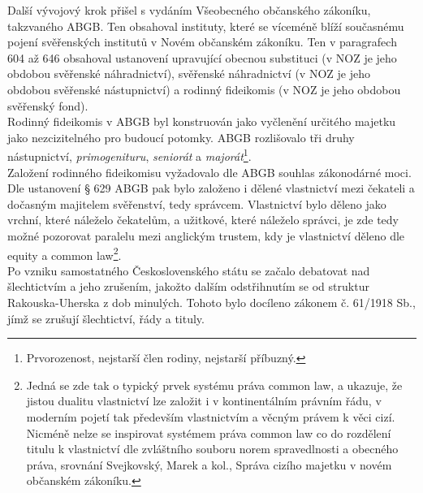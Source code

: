 \documentclass{article}
\begin{document}

Další vývojový krok přišel s vydáním Všeobecného občanského zákoníku, takzvaného ABGB. Ten obsahoval instituty, které se víceméně blíží současnému pojení svěřenských institutů v Novém občanském zákoníku. Ten v paragrafech 604 až 646 obsahoval ustanovení upravující obecnou substituci (v NOZ je jeho obdobou svěřenské náhradnictví), svěřenské náhradnictví (v NOZ je jeho obdobou svěřenské nástupnictví) a rodinný fideikomis (v NOZ je jeho obdobou svěřenský fond).\\

Rodinný fideikomis v ABGB byl konstruován jako vyčlenění určitého majetku jako nezcizitelného pro budoucí potomky. ABGB rozlišovalo tři druhy nástupnictví, \textit{primogenituru}, \textit{seniorát} a \textit{majorát}\footnote{Prvorozenost, nejstarší člen rodiny, nejstarší příbuzný.}.\\

Založení rodinného fideikomisu vyžadovalo dle ABGB souhlas zákonodárné moci. Dle ustanovení § 629 ABGB pak bylo založeno i dělené vlastnictví mezi čekateli a dočasným majitelem svěřenství, tedy správcem. Vlastnictví bylo děleno jako vrchní, které náleželo čekatelům, a užitkové, které náleželo správci, je zde tedy možné pozorovat paralelu mezi anglickým trustem, kdy je vlastnictví děleno dle equity a common law\footnote{Jedná se zde tak o typický prvek systému práva common law, a ukazuje, že jistou dualitu vlastnictví lze založit i v kontinentálním právním řádu, v moderním pojetí tak především vlastnictvím a věcným právem k věci cizí. Nicméně nelze se inspirovat systémem práva common law co do rozdělení titulu k vlastnictví dle zvláštního souboru norem spravedlnosti a obecného práva, srovnání Svejkovský, Marek a kol., Správa cizího majetku v novém občanském zákoníku.}.\\

Po vzniku samostatného Československého státu se začalo debatovat nad šlechtictvím a jeho zrušením, jakožto dalším odstřihnutím se od struktur Rakouska-Uherska z dob minulých. Tohoto bylo docíleno zákonem č. 61/1918 Sb., jímž se zrušují šlechtictví, řády a tituly.\\
\end{document}

